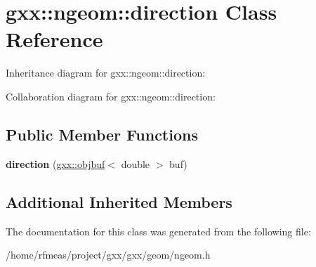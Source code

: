 \hypertarget{classgxx_1_1ngeom_1_1direction}{}\section{gxx\+:\+:ngeom\+:\+:direction Class Reference}
\label{classgxx_1_1ngeom_1_1direction}


Inheritance diagram for gxx\+:\+:ngeom\+:\+:direction\+:


Collaboration diagram for gxx\+:\+:ngeom\+:\+:direction\+:
\subsection*{Public Member Functions}
\begin{DoxyCompactItemize}
\item 
{\bfseries direction} (\hyperlink{classgxx_1_1object__buffer}{gxx\+::objbuf}$<$ double $>$ buf)\hypertarget{classgxx_1_1ngeom_1_1direction_a27b9b59ef7e2f99c9555b051447530a3}{}\label{classgxx_1_1ngeom_1_1direction_a27b9b59ef7e2f99c9555b051447530a3}

\end{DoxyCompactItemize}
\subsection*{Additional Inherited Members}


The documentation for this class was generated from the following file\+:\begin{DoxyCompactItemize}
\item 
/home/rfmeas/project/gxx/gxx/geom/ngeom.\+h\end{DoxyCompactItemize}
